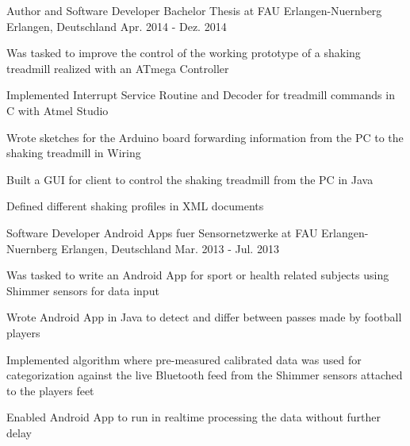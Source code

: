\begin{cventries}
  \cventry
    {Author and Software Developer} %
    {Bachelor Thesis at FAU Erlangen-Nuernberg} %
    {Erlangen, Deutschland} %
    {Apr. 2014 - Dez. 2014} %
    {
      \begin{cvitems} %
        \item {Was tasked to improve the control of the working prototype of a shaking treadmill realized with an ATmega Controller}
        \item {Implemented Interrupt Service Routine and Decoder for treadmill commands in C with Atmel Studio}
        \item {Wrote sketches for the Arduino board forwarding information from the PC to the shaking treadmill in Wiring}
        \item {Built a GUI for client to control the shaking treadmill from the PC in Java}
        \item {Defined different shaking profiles in XML documents}
      \end{cvitems}
    }

  \cventry
    {Software Developer} %
    {Android Apps fuer Sensornetzwerke at FAU Erlangen-Nuernberg} %
    {Erlangen, Deutschland} %
    {Mar. 2013 - Jul. 2013} %
    {
      \begin{cvitems} %
        \item {Was tasked to write an Android App for sport or health related subjects using Shimmer sensors for data input}
        \item {Wrote Android App in Java to detect and differ between passes made by football players}
        \item {Implemented algorithm where pre-measured calibrated data was used for categorization against the live Bluetooth feed from the Shimmer sensors attached to the players feet}
        \item {Enabled Android App to run in realtime processing the data without further delay}
      \end{cvitems}
    }

\end{cventries}
